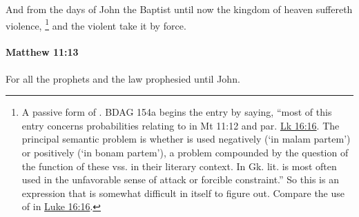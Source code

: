 			And from the days of John the Baptist until now the kingdom of heaven suffereth violence,%
				\footnote{%
					A passive form of . BDAG 154a begins the entry by saying, ``most of this entry concerns probabilities relating to  in Mt 11:12 and par. \hyperref[LUKE-16-16]{Lk 16:16}. The principal semantic problem is whether  is used negatively (`in malam partem') or positively (`in bonam partem'), a problem compounded by the question of the function of these vss. in their literary context. In Gk. lit.  is most often used in the unfavorable sense of attack or forcible constraint.'' So this is an expression that is somewhat difficult in itself to figure out. Compare the use of  in \hyperref[LUKE-16-16]{Luke 16:16}.
					}
			and the violent take it by force.

			\begin{framed}
			\scriptsize
				\begin{compactdesc}
					\item[SBLG] 
				\end{compactdesc}
			\end{framed}

		\paragraph{Matthew 11:13} %
			\label{MATTHEW-11-13}

			For all the prophets and the law prophesied until John.

